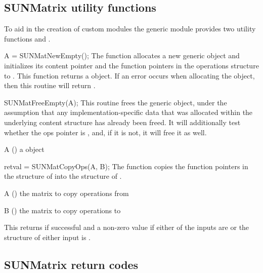 \subsection{SUNMatrix utility functions}\label{ss:sunmatrix_utilities}

To aid in the creation of custom {\sunmatrix} modules the generic {\sunmatrix}
module provides two utility functions  and
.

{
  A = SUNMatNewEmpty();
}
{
  The function  allocates a new generic {\sunmatrix} object
  and initializes its content pointer and the function pointers in the
  operations structure to .
}
{}
{
  This function returns a  object. If an error occurs when
  allocating the object, then this routine will return .
}
{}

{
  SUNMatFreeEmpty(A);
}
{
  This routine frees the generic  object, under the assumption that any
  implementation-specific data that was allocated within the underlying content structure
  has already been freed. It will additionally test whether the ops pointer is ,
  and, if it is not, it will free it as well.
}
{
  \begin{args}[A]
  \item[A] () a  object
  \end{args}
}
{}
{}

{
  retval = SUNMatCopyOps(A, B);
}
{
  The function  copies the function pointers in the 
  structure of  into the  structure of .
}
{
  \begin{args}[A]
  \item[A] () the matrix to copy operations from
  \item[B] () the matrix to copy operations to
  \end{args}
}
{
  This returns  if successful and a non-zero value if either of the inputs
  are  or the  structure of either input is .
}
{}


\subsection{SUNMatrix return codes}\label{ss:sunmatrix_ReturnCodes}


